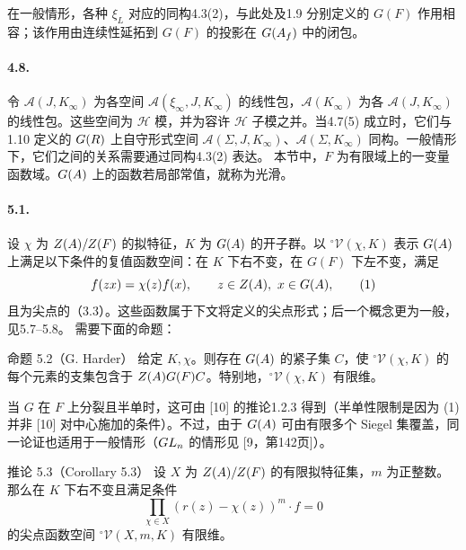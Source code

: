 在一般情形，各种 $\xi_L$ 对应的同构4.3(2)，与此处及1.9 分别定义的 $G(F)$ 作用相容；该作用由连续性延拓到 $G(F)$ 的投影在 $G(A_f)$ 中的闭包。
\paragraph*{4.8.}
令 $\mathcal A(J,K_\infty)$ 为各空间 $\mathcal A(\xi_\infty,J,K_\infty)$ 的线性包，$\mathcal A(K_\infty)$ 为各 $\mathcal A(J,K_\infty)$ 的线性包。这些空间为 $\mathcal H$ 模，并为容许 $\mathcal H$ 子模之并。当4.7(5) 成立时，它们与1.10 定义的 $G(R)$ 上自守形式空间 $\mathcal A(\Sigma,J,K_\infty)$、$\mathcal A(\Sigma,K_\infty)$ 同构。一般情形下，它们之间的关系需要通过同构4.3(2) 表达。
本节中，$F$ 为有限域上的一变量函数域。$G(A)$ 上的函数若局部常值，就称为光滑。
\paragraph*{5.1.}
设 $\chi$ 为 $Z(A)/Z(F)$ 的拟特征，$K$ 为 $G(A)$ 的开子群。以 $^\circ\mathcal V(\chi,K)$ 表示 $G(A)$ 上满足以下条件的复值函数空间：在 $K$ 下右不变，在 $G(F)$ 下左不变，满足
\[
f(zx)=\chi(z)f(x),\qquad z\in Z(A),\ x\in G(A),\tag{1}
\]
且为尖点的（3.3）。这些函数属于下文将定义的尖点形式；后一个概念更为一般，见5.7--5.8。 需要下面的命题：
\begin{originaltheorem}{命题 5.2（G. Harder）}
给定 $K,\chi$。则存在 $G(A)$ 的紧子集 $C$，使 $^\circ\mathcal V(\chi,K)$ 的每个元素的支集包含于 $Z(A)G(F)C$。特别地，$^\circ\mathcal V(\chi,K)$ 有限维。
\end{originaltheorem}
当 $G$ 在 $F$ 上分裂且半单时，这可由 [10] 的推论1.2.3 得到（半单性限制是因为 (1) 并非 [10] 对中心施加的条件）。不过，由于 $G(A)$ 可由有限多个 Siegel 集覆盖，同一论证也适用于一般情形（$GL_n$ 的情形见 [9，第142页]）。
\begin{originaltheorem}{推论 5.3（Corollary 5.3）}
设 $X$ 为 $Z(A)/Z(F)$ 的有限拟特征集，$m$ 为正整数。那么在 $K$ 下右不变且满足条件
\[
\prod_{\chi\in X}(r(z)-\chi(z))^m\cdot f=0\tag{1}
\]
的尖点函数空间 $^\circ\mathcal V(X,m,K)$ 有限维。
\end{originaltheorem}
